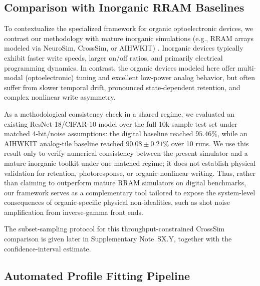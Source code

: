 \subsection{Comparison with Inorganic RRAM Baselines}
\label{subsec:inorganic-comparison}

To contextualize the specialized framework for organic optoelectronic devices, we contrast our methodology with mature inorganic simulations (e.g., RRAM arrays modeled via NeuroSim, CrossSim, or AIHWKIT) \citep{peng2020dnnneurosim,crosssim2026,rasch2021aihwkit}. Inorganic devices typically exhibit faster write speeds, larger on/off ratios, and primarily electrical programming dynamics. In contrast, the organic devices modeled here offer multi-modal (optoelectronic) tuning and excellent low-power analog behavior, but often suffer from slower temporal drift, pronounced state-dependent retention, and complex nonlinear write asymmetry.

As a methodological consistency check in a shared regime, we evaluated an existing ResNet-18/CIFAR-10 model over the full 10k-sample test set under matched 4-bit/noise assumptions: the digital baseline reached \(95.46\%\), while an AIHWKIT analog-tile baseline reached \(90.08\pm0.21\%\) over 10 runs. We use this result only to verify numerical consistency between the present simulator and a mature inorganic toolkit under one matched regime; it does not establish physical validation for retention, photoresponse, or organic nonlinear writing. Thus, rather than claiming to outperform mature RRAM simulators on digital benchmarks, our framework serves as a complementary tool tailored to expose the system-level consequences of organic-specific physical non-idealities, such as shot noise amplification from inverse-gamma front ends.

The subset-sampling protocol for this throughput-constrained CrossSim comparison
is given later in Supplementary Note~SX.Y, together with the confidence-interval
estimate.

\subsection{Automated Profile Fitting Pipeline}

